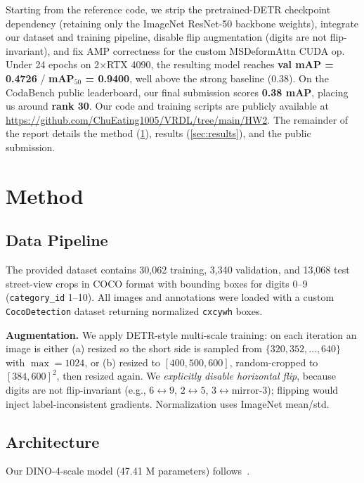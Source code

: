 \documentclass[10pt,twocolumn,letterpaper]{article}
\begin{document}
Starting from the reference code, we strip the pretrained-DETR checkpoint dependency (retaining only the ImageNet ResNet-50 backbone weights), integrate our dataset and training pipeline, disable flip augmentation (digits are not flip-invariant), and fix AMP correctness for the custom MSDeformAttn CUDA op. Under 24 epochs on 2$\times$RTX 4090, the resulting model reaches \textbf{val mAP = 0.4726} / \textbf{mAP$_{50}$ = 0.9400}, well above the strong baseline (0.38). On the CodaBench public leaderboard, our final submission scores \textbf{0.38 mAP}, placing us around \textbf{rank 30}. Our code and training scripts are publicly available at \url{https://github.com/ChuEating1005/VRDL/tree/main/HW2}. The remainder of the report details the method (\cref{sec:method}), results (\cref{sec:results}), and the public submission.

\section{Method}
\label{sec:method}

\subsection{Data Pipeline}
The provided dataset contains 30{,}062 training, 3{,}340 validation, and 13{,}068 test street-view crops in COCO format with bounding boxes for digits 0--9 (\texttt{category\_id} 1--10). All images and annotations were loaded with a custom \texttt{CocoDetection} dataset returning normalized \texttt{cxcywh} boxes.

\textbf{Augmentation.} We apply DETR-style multi-scale training: on each iteration an image is either (a) resized so the short side is sampled from $\{320,352,\ldots,640\}$ with $\max = 1024$, or (b) resized to $[400,500,600]$, random-cropped to $[384,600]^2$, then resized again. We \emph{explicitly disable horizontal flip}, because digits are not flip-invariant (e.g., $6 \leftrightarrow 9$, $2 \leftrightarrow 5$, $3 \leftrightarrow \text{mirror-3}$); flipping would inject label-inconsistent gradients. Normalization uses ImageNet mean/std.

\subsection{Architecture}
Our DINO-4-scale model (47.41 M parameters) follows~\cite{zhang2023dino}.
\end{document}
